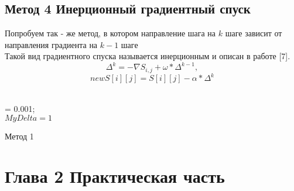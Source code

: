 \documentclass[ 12pt,x11names]{article}
\begin{document}
    \subsection{Метод 4 Инерционный градиентный спуск}
    Попробуем так - же метод, в котором направление шага на $k$ шаге зависит от направления градиента на $k - 1$ шаге\\
    Такой вид градиентного спуска называется инерционным и описан в работе [7].
    \\
\begin{equation}
\label{eq:pareto mle2}
     \Delta^k = -\nabla S_{i, j} +
     \omega * \Delta ^  {k-1} ,
\end{equation}
\begin{equation}
\label{eq:pareto mle2}
		            newS[i][j] = S[i][j] - \alpha * \Delta^k
\end{equation}\\
    \begin{algorithm}[H]
		\SetAlgoLined
		\alpha = 0.001;\\
		$ MyDelta  = 1$\\
	\caption{Метод 1}
    \end{algorithm}
    \newpage
    \section{
    Глава 2
    Практическая часть}
\end{document}
